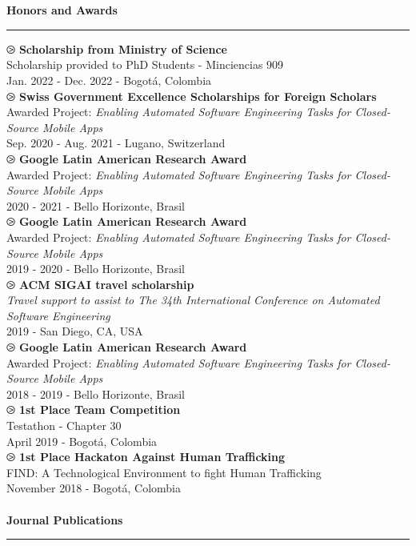 \documentclass[letterpaper,11pt,oneside]{article}
\begin{document}
\\ \\
\noindent \Large{\textbf{Honors and Awards}} \\
\vspace{-2ex}
\hrule 
\normalsize
\vspace{2ex}
\noindent $\ogreaterthan$ \textbf{Scholarship from Ministry of Science } \\
Scholarship provided to PhD Students - Minciencias 909\\
Jan. 2022 - Dec. 2022 - Bogot\'a, Colombia \\
\noindent $\ogreaterthan$ \textbf{Swiss Government Excellence Scholarships for Foreign Scholars} \\
Awarded Project: \textit{Enabling Automated Software Engineering Tasks for Closed-Source Mobile Apps}\\
Sep. 2020 - Aug. 2021 - Lugano, Switzerland \\
\noindent $\ogreaterthan$ \textbf{Google Latin American Research Award} \\
Awarded Project: \textit{Enabling Automated Software Engineering Tasks for Closed-Source Mobile Apps}\\
2020 - 2021 - Bello Horizonte, Brasil \\
\noindent $\ogreaterthan$ \textbf{Google Latin American Research Award} \\
Awarded Project: \textit{Enabling Automated Software Engineering Tasks for Closed-Source Mobile Apps}\\
2019 - 2020 - Bello Horizonte, Brasil \\
\noindent $\ogreaterthan$ \textbf{ACM SIGAI travel scholarship} \\
\textit{Travel support to assist to The 34th International Conference on Automated Software Engineering }\\
2019 - San Diego, CA, USA \\
\noindent $\ogreaterthan$ \textbf{Google Latin American Research Award} \\
Awarded Project: \textit{Enabling Automated Software Engineering Tasks for Closed-Source Mobile Apps}\\
2018 - 2019 - Bello Horizonte, Brasil \\
\noindent $\ogreaterthan$ \textbf{1st Place Team Competition} \\
Testathon - Chapter 30\\
April 2019 - Bogotá, Colombia \\
\noindent $\ogreaterthan$ \textbf{1st Place Hackaton Against Human Trafficking} \\
FIND: A Technological Environment to fight Human Trafficking\\
November 2018 - Bogotá, Colombia \\
\\
\noindent \Large{\textbf{Journal Publications}} \\
\vspace{-2ex}
\hrule 
\normalsize
\vspace{0.5cm}
\end{document}

